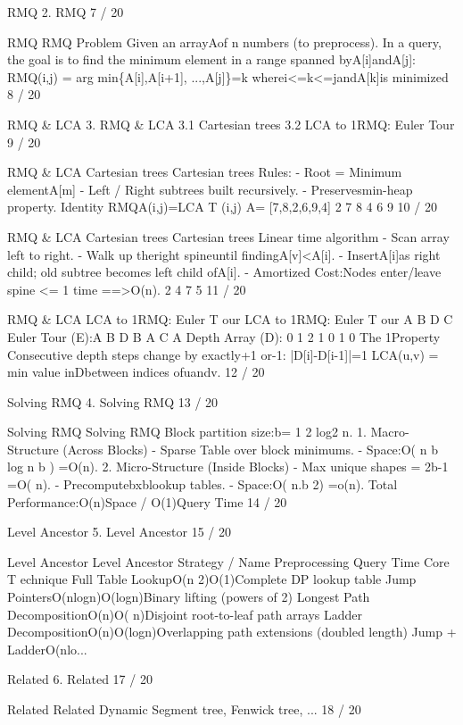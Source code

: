\begin{description}[leftmargin=!,labelwidth=4.2em,style=nextline]
\item[Pag. 11] RMQ 2. RMQ 7 / 20
\item[Pag. 12] RMQ RMQ Problem Given an arrayAof n numbers (to preprocess). In a query, the goal is to find the minimum element in a range spanned byA[i]andA[j]: RMQ(i,j) = arg min\{A[i],A[i+1], ...,A[j]\}=k wherei<=k<=jandA[k]is minimized 8 / 20
\item[Pag. 13] RMQ \& LCA 3. RMQ \& LCA 3.1 Cartesian trees 3.2 LCA to 1RMQ: Euler Tour 9 / 20
\item[Pag. 14] RMQ \& LCA Cartesian trees Cartesian trees Rules: - Root = Minimum elementA[m] - Left / Right subtrees built recursively. - Preservesmin-heap property. Identity RMQA(i,j)=LCA T (i,j) A= [7,8,2,6,9,4] 2 7 8 4 6 9 10 / 20
\item[Pag. 15] RMQ \& LCA Cartesian trees Cartesian trees Linear time algorithm - Scan array left to right. - Walk up theright spineuntil findingA[v]<A[i]. - InsertA[i]as right child; old subtree becomes left child ofA[i]. - Amortized Cost:Nodes enter/leave spine <= 1 time ==>O(n). 2 4 7 5 11 / 20
\item[Pag. 16] RMQ \& LCA LCA to 1RMQ: Euler T our LCA to 1RMQ: Euler T our A B D C Euler Tour (E):A B D B A C A Depth Array (D): 0 1 2 1 0 1 0 The 1Property Consecutive depth steps change by exactly+1 or-1: |D[i]-D[i-1]|=1 LCA(u,v) = min value inDbetween indices ofuandv. 12 / 20
\item[Pag. 17] Solving RMQ 4. Solving RMQ 13 / 20
\item[Pag. 18] Solving RMQ Solving RMQ Block partition size:b= 1 2 log2 n. 1. Macro-Structure (Across Blocks) - Sparse Table over block minimums. - Space:O( n b log n b ) =O(n). 2. Micro-Structure (Inside Blocks) - Max unique shapes = 2b-1 =O(  n). - Precomputebxblookup tables. - Space:O(  n.b 2) =o(n). Total Performance:O(n)Space / O(1)Query Time 14 / 20
\item[Pag. 19] Level Ancestor 5. Level Ancestor 15 / 20
\item[Pag. 20] Level Ancestor Level Ancestor Strategy / Name Preprocessing Query Time Core T echnique Full Table LookupO(n 2)O(1)Complete DP lookup table Jump PointersO(nlogn)O(logn)Binary lifting (powers of 2) Longest Path DecompositionO(n)O(  n)Disjoint root-to-leaf path arrays Ladder DecompositionO(n)O(logn)Overlapping path extensions (doubled length) Jump + LadderO(nlo...
\item[Pag. 21] Related 6. Related 17 / 20
\item[Pag. 22] Related Related Dynamic Segment tree, Fenwick tree, ... 18 / 20

\end{description}
